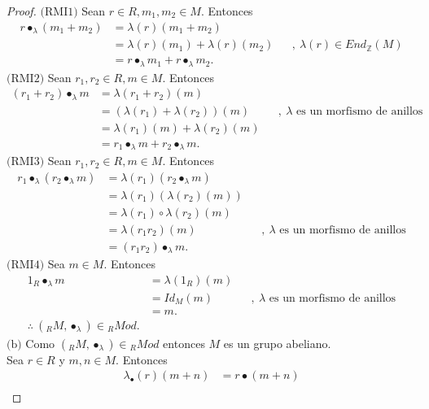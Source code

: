 \documentclass{article}
\newcommand{\lrprth}[1]{
    \left(#1\right)
}
\newcommand{\zend}[2]{
    End_{\mathbb{Z}}^{#2}\lrprth{#1}
}
\theoremstyle{definition}
\theoremstyle{plain}
\theoremstyle{plain}
\theoremstyle{definition}
\theoremstyle{definition}
\theoremstyle{definition}
\theoremstyle{definition}
\theoremstyle{definition}
\theoremstyle{definition}
\begin{document}
\begin{enumerate}[label=\textbf{Ej \arabic*.}]
\begin{proof}
    $\boxed{\text{(RMI1)}}$ Sean $r\in R, m_1,m_2\in M$. Entonces
    \begin{align*}
        r\bullet_{\lambda}\lrprth{m_1+m_2}&=\lambda(r)\lrprth{m_1+m_2}\\
        &=\lambda(r)\lrprth{m_1}+\lambda(r)\lrprth{m_2} && ,\ \lambda(r)\in \zend{M}{}\\
        &=r\bullet_\lambda m_1+r\bullet_\lambda m_2.
    \end{align*}
    $\boxed{\text{(RMI2)}}$ Sean $r_1,r_2\in R, m\in M$. Entonces
    \begin{align*}
        \lrprth{r_1+r_2}\bullet_\lambda m &=\lambda\lrprth{r_1+r_2}\lrprth{m}\\
        &=\lrprth{\lambda(r_1)+\lambda(r_2)}\lrprth{m} && ,\ \lambda\text{ es un morfismo de anillos}\\
        &=\lambda(r_1)\lrprth{m}+\lambda(r_2)\lrprth{m}\\
        &=r_1\bullet_\lambda m+r_2\bullet_\lambda m.
    \end{align*}
    $\boxed{\text{(RMI3)}}$ Sean $r_1,r_2\in R, m\in M$. Entonces
    \begin{align*}
        r_1\bullet_\lambda\lrprth{r_2\bullet_\lambda m}&= \lambda(r_1)\lrprth{r_2\bullet_\lambda m}\\
        &=\lambda(r_1)\lrprth{\lambda(r_2)\lrprth{m}}\\
        &=\lambda(r_1)\circ\lambda(r_2)\lrprth{m}\\
        &=\lambda(r_1r_2)\lrprth{m} && ,\ \lambda\text{ es un morfismo de anillos}\\
        &=\lrprth{r_1r_2}\bullet_\lambda m.
    \end{align*}
    $\boxed{\text{(RMI4)}}$ Sea $m\in M$. Entonces
    \begin{align*}
        1_R\bullet_\lambda m&=\lambda(1_R)\lrprth{m}\\
        &=Id_M\lrprth{m} && ,\ \lambda\text{ es un morfismo de anillos}\\
        &=m.\\
        \therefore\ \lrprth{{}_RM,\bullet_\lambda}\in{}_RMod.
    \end{align*}
    $\boxed{\text{(b)}}$ Como $\lrprth{{}_RM,\bullet_\lambda}\in{}_RMod$ entonces $M$ es un grupo abeliano.\\
    Sea $r\in R$ y $m,n\in M$. Entonces
    \begin{align*}
        \lambda_\bullet(r)\lrprth{m+n}&=r\bullet\lrprth{m+n}\\

\end{align*}
\end{proof}
\end{enumerate}
\end{document}
